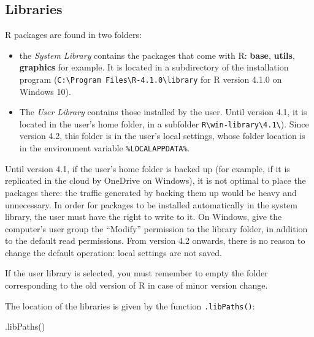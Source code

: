 \documentclass[
  12pt,
  american,
  a4paper,
  extrafontsizes,onecolumn,openright
  ]{memoir}
\newenvironment{Shaded}{\begin{snugshade}}{\end{snugshade}}
\newcommand{\FunctionTok}[1]{\textcolor[rgb]{0.00,0.00,0.00}{#1}}
\newcommand{\NormalTok}[1]{#1}
\providecommand{\tightlist}{%
  \setlength{\itemsep}{0pt}\setlength{\parskip}{0pt}}
\begin{document}
\hypertarget{sec:librairies}{%
\subsection{Libraries}\label{sec:librairies}}

R packages are found in two folders:

\begin{itemize}
\tightlist
\item
  the \emph{System Library} contains the packages that come with R: \textbf{base}, \textbf{utils}, \textbf{graphics} for example.
  It is located in a subdirectory of the installation program (\texttt{C:\textbackslash{}Program\ Files\textbackslash{}R-4.1.0\textbackslash{}library} for R version 4.1.0 on Windows 10).
\item
  The \emph{User Library} contains those installed by the user.
  Until version 4.1, it is located in the user's home folder, in a subfolder \texttt{R\textbackslash{}win-library\textbackslash{}4.1\textbackslash{}}).
  Since version 4.2, this folder is in the user's local settings, whose folder location is in the environment variable \texttt{\%LOCALAPPDATA\%}.
\end{itemize}

Until version 4.1, if the user's home folder is backed up (for example, if it is replicated in the cloud by OneDrive on Windows), it is not optimal to place the packages there: the traffic generated by backing them up would be heavy and unnecessary.
In order for packages to be installed automatically in the system library, the user must have the right to write to it.
On Windows, give the computer's user group the \enquote{Modify} permission to the library folder, in addition to the default read permissions.
From version 4.2 onwards, there is no reason to change the default operation: local settings are not saved.

If the user library is selected, you must remember to empty the folder corresponding to the old version of R in case of minor version change.

The location of the libraries is given by the function \texttt{.libPaths()}:

\scriptsize

\begin{Shaded}
\begin{Highlighting}[]
\FunctionTok{.libPaths}\NormalTok{()}
\end{Highlighting}
\end{Shaded}
\end{document}

